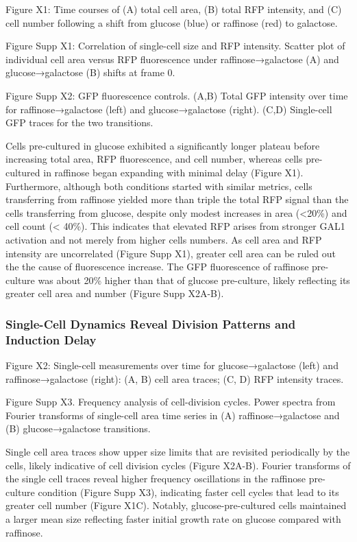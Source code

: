 Figure X1: Time courses of (A) total cell area, (B) total RFP intensity,
and (C) cell number following a shift from glucose (blue) or raffinose
(red) to galactose.

Figure Supp X1: Correlation of single-cell size and RFP intensity.
Scatter plot of individual cell area versus RFP fluorescence under
raffinose→galactose (A) and glucose→galactose (B) shifts at frame 0.

Figure Supp X2: GFP fluorescence controls. (A,B) Total GFP intensity
over time for raffinose→galactose (left) and glucose→galactose (right).
(C,D) Single-cell GFP traces for the two transitions.

Cells pre-cultured in glucose exhibited a significantly longer plateau
before increasing total area, RFP fluorescence, and cell number, whereas
cells pre-cultured in raffinose began expanding with minimal delay
(Figure X1). Furthermore, although both conditions started with similar
metrics, cells transferring from raffinose yielded more than triple the
total RFP signal than the cells transferring from glucose, despite only
modest increases in area (\textless20\%) and cell count (\textless{}
40\%). This indicates that elevated RFP arises from stronger GAL1
activation and not merely from higher cells numbers. As cell area and
RFP intensity are uncorrelated (Figure Supp X1), greater cell area can
be ruled out the the cause of fluorescence increase. The GFP
fluorescence of raffinose pre-culture was about 20\% higher than that of
glucose pre-culture, likely reflecting its greater cell area and number
(Figure Supp X2A-B).

\subsubsection{Single-Cell Dynamics Reveal Division Patterns and
Induction
Delay}\label{single-cell-dynamics-reveal-division-patterns-and-induction-delay}

Figure X2: Single-cell measurements over time for glucose→galactose
(left) and raffinose→galactose (right): (A, B) cell area traces; (C, D)
RFP intensity traces.

Figure Supp X3. Frequency analysis of cell-division cycles. Power
spectra from Fourier transforms of single-cell area time series in (A)
raffinose→galactose and (B) glucose→galactose transitions.

Single cell area traces show upper size limits that are revisited
periodically by the cells, likely indicative of cell division cycles
(Figure X2A-B). Fourier transforms of the single cell traces reveal
higher frequency oscillations in the raffinose pre-culture condition
(Figure Supp X3), indicating faster cell cycles that lead to its greater
cell number (Figure X1C). Notably, glucose-pre-cultured cells maintained
a larger mean size reflecting faster initial growth rate on glucose
compared with raffinose.

